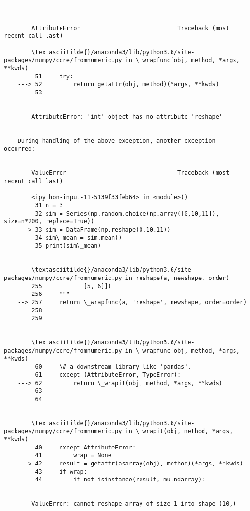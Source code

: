\documentclass[11pt]{article}
\begin{document}
    \begin{Verbatim}[commandchars=\\\{\}]

        ---------------------------------------------------------------------------

        AttributeError                            Traceback (most recent call last)

        \textasciitilde{}/anaconda3/lib/python3.6/site-packages/numpy/core/fromnumeric.py in \_wrapfunc(obj, method, *args, **kwds)
         51     try:
    ---> 52         return getattr(obj, method)(*args, **kwds)
         53 


        AttributeError: 'int' object has no attribute 'reshape'

        
    During handling of the above exception, another exception occurred:


        ValueError                                Traceback (most recent call last)

        <ipython-input-11-5139f33feb64> in <module>()
         31 n = 3
         32 sim = Series(np.random.choice(np.array([0,10,11]), size=n*200, replace=True))
    ---> 33 sim = DataFrame(np.reshape(0,10,11))
         34 sim\_mean = sim.mean()
         35 print(sim\_mean)


        \textasciitilde{}/anaconda3/lib/python3.6/site-packages/numpy/core/fromnumeric.py in reshape(a, newshape, order)
        255            [5, 6]])
        256     """
    --> 257     return \_wrapfunc(a, 'reshape', newshape, order=order)
        258 
        259 


        \textasciitilde{}/anaconda3/lib/python3.6/site-packages/numpy/core/fromnumeric.py in \_wrapfunc(obj, method, *args, **kwds)
         60     \# a downstream library like 'pandas'.
         61     except (AttributeError, TypeError):
    ---> 62         return \_wrapit(obj, method, *args, **kwds)
         63 
         64 


        \textasciitilde{}/anaconda3/lib/python3.6/site-packages/numpy/core/fromnumeric.py in \_wrapit(obj, method, *args, **kwds)
         40     except AttributeError:
         41         wrap = None
    ---> 42     result = getattr(asarray(obj), method)(*args, **kwds)
         43     if wrap:
         44         if not isinstance(result, mu.ndarray):


        ValueError: cannot reshape array of size 1 into shape (10,)

    \end{Verbatim}
\end{document}
